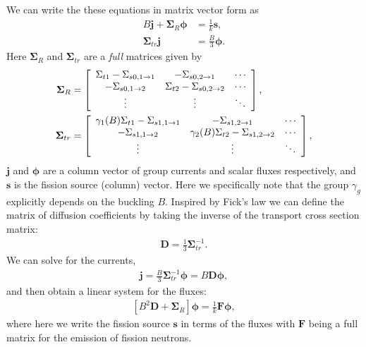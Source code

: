 We can write the these equations in matrix vector form as
\begin{subequations}
\begin{align}
  B \mathbf{j} + \boldsymbol\Sigma_R \boldsymbol\phi &= \frac{1}{k} \mathbf{s} , \\
  \boldsymbol\Sigma_{tr} \mathbf{j} &= \frac{B}{3} \boldsymbol\phi . \label{Eq:diffusion_B1Current_MatrixVector}
\end{align}
\end{subequations}
Here $\boldsymbol\Sigma_{R}$ and  $\boldsymbol\Sigma_{tr}$ are a \emph{full} matrices given by
\begin{subequations}
\begin{align}
  \boldsymbol\Sigma_{R} &= \left[ \begin{array}{c c c}
  \Sigma_{t1} - \Sigma_{s0, 1 \rightarrow 1} & -\Sigma_{s0,2 \rightarrow 1} & \cdots \\
  -\Sigma_{s0,1 \rightarrow 2} & \Sigma_{t2} - \Sigma_{s0, 2 \rightarrow 2} & \cdots \\
  \vdots & \vdots & \ddots \\ \end{array} \right] , \\
  \boldsymbol\Sigma_{tr} &= \left[ \begin{array}{c c c}
  \gamma_1(B) \Sigma_{t1} - \Sigma_{s1, 1 \rightarrow 1} & -\Sigma_{s1,2 \rightarrow 1} & \cdots \\
  -\Sigma_{s1,1 \rightarrow 2} & \gamma_2(B) \Sigma_{t2} - \Sigma_{s1, 2 \rightarrow 2} & \cdots \\
  \vdots & \vdots & \ddots \\ \end{array} \right] ,
\end{align}
\end{subequations}
$\mathbf{j}$ and $\boldsymbol\phi$ are a column vector of group currents and scalar fluxes respectively, and $\mathbf{s}$ is the fission source (column) vector. Here we specifically note that the group $\gamma_g$ explicitly depends on the buckling $B$. Inspired by Fick's law we can define the matrix of diffusion coefficients by taking the inverse of the transport cross section matrix:
\begin{align}
  \mathbf{D} = \frac{1}{3} \boldsymbol\Sigma_{tr}^{-1} .
\end{align}
We can solve for the currents,
\begin{align}
  \mathbf{j} = \frac{B}{3} \boldsymbol\Sigma_{tr}^{-1} \boldsymbol\phi = B \mathbf{D} \boldsymbol\phi ,
\end{align}
and then obtain a linear system for the fluxes:
\begin{align}
  \left[ B^2 \mathbf{D} + \boldsymbol\Sigma_R \right] \boldsymbol\phi = \frac{1}{k} \mathbf{F} \boldsymbol\phi, \label{Eq:diffusion_B1Diffusion_MatrixVector}
\end{align}
where here we write the fission source $\mathbf{s}$ in terms of the fluxes with $\mathbf{F}$ being a full matrix for the emission of fission neutrons.

